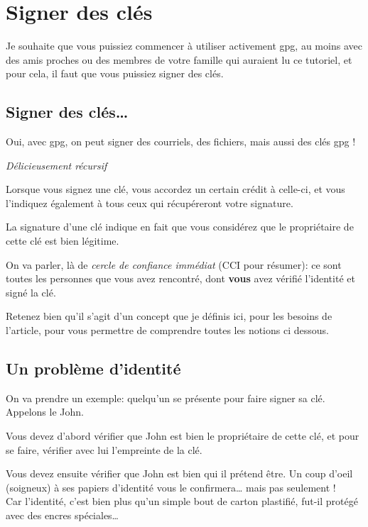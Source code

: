 \chapter{Signer des clés}

Je souhaite que vous puissiez commencer à utiliser activement gpg, au
moins avec des amis proches ou des membres de votre famille qui auraient
lu ce tutoriel, et pour cela, il faut que vous puissiez signer des clés.

\section{Signer des clés\ldots{}}\label{signer-des-cluxe9s}

Oui, avec gpg, on peut signer des courriels, des fichiers, mais aussi
des clés gpg !

\emph{Délicieusement récursif}

Lorsque vous signez une clé, vous accordez un certain crédit à celle-ci,
et vous l'indiquez également à tous ceux qui récupéreront votre
signature.

La signature d'une clé indique en fait que vous considérez que le
propriétaire de cette clé est bien légitime.

On va parler, là de \emph{cercle de confiance immédiat} (CCI pour
résumer): ce sont toutes les personnes que vous avez rencontré, dont
\textbf{vous} avez vérifié l'identité et signé la clé.

Retenez bien qu'il s'agit d'un concept que je définis ici, pour les
besoins de l'article, pour vous permettre de comprendre toutes les
notions ci dessous.

\section{Un problème d'identité}\label{un-probluxe8me-didentituxe9}

On va prendre un exemple: quelqu'un se présente pour faire signer sa
clé. Appelons le John.

Vous devez d'abord vérifier que John est bien le propriétaire de cette
clé, et pour se faire, vérifier avec lui l'empreinte de la clé.

Vous devez ensuite vérifier que John est bien qui il prétend être. Un
coup d'oeil (soigneux) à ses papiers d'identité vous le
confirmera\ldots{} mais pas seulement !\\Car l'identité, c'est bien plus
qu'un simple bout de carton plastifié, fut-il protégé avec des encres
spéciales\ldots{}

